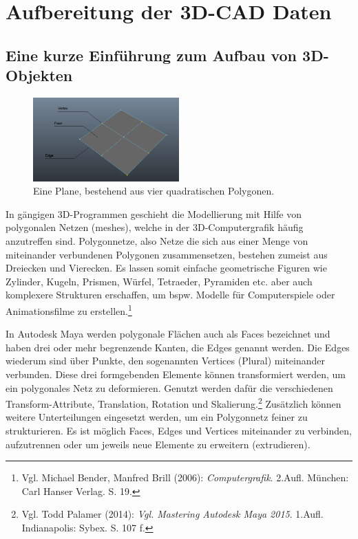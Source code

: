 \chapter{Aufbereitung der 3D-CAD Daten}
\label{sec:AufbereitungDer3D-CADDaten}

\section{Eine kurze Einführung zum Aufbau von 3D-Objekten}
\label{sec:KurzerEinschubZumAufbauVon3D-Objekten}

\begin{figure}
	\centering
	\includegraphics[width=0.5\textwidth]{bildquellen/face_edge_vertex}
	\caption{Eine Plane, bestehend aus vier quadratischen Polygonen.}
\end{figure}
In gängigen 3D-Programmen geschieht die Modellierung mit Hilfe von polygonalen Netzen (meshes), welche in der 3D-Computergrafik häufig anzutreffen sind. Polygonnetze, also Netze die sich aus einer Menge von miteinander verbundenen Polygonen zusammensetzen, bestehen zumeist aus Dreiecken und Vierecken. Es lassen somit einfache geometrische Figuren wie Zylinder, Kugeln, Prismen, Würfel, Tetraeder, Pyramiden etc. aber auch komplexere Strukturen erschaffen, um bspw. Modelle für Computerspiele oder Animationsfilme zu erstellen.\footnote{Vgl. Michael Bender, Manfred Brill (2006): \textit{Computergrafik}. 2.Aufl. München: \newline Carl Hanser Verlag. S. 19.}

In Autodesk Maya werden polygonale Flächen auch als Faces bezeichnet und haben drei oder mehr begrenzende Kanten, die Edges genannt werden. Die Edges wiederum sind über Punkte, den sogenannten Vertices (Plural) miteinander verbunden. Diese drei formgebenden Elemente können transformiert werden, um ein polygonales Netz zu deformieren. Genutzt werden dafür die verschiedenen Transform-Attribute, Translation, Rotation und Skalierung.\footnote{Vgl. Todd Palamer (2014): \textit{Vgl. Mastering Autodesk Maya 2015}. 1.Aufl. Indianapolis: Sybex. S. 107 f.} Zusätzlich können weitere Unterteilungen eingesetzt werden, um ein Polygonnetz feiner zu strukturieren. Es ist möglich Faces, Edges und Vertices miteinander zu verbinden, aufzutrennen oder um jeweils neue Elemente zu erweitern (extrudieren). 

